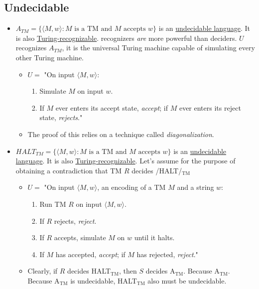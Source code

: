 \documentclass[12pt]{article}
\begin{document}
\subsection{Undecidable}
\label{sec:orgba64b64}
\begin{itemize}
\item \(A_{TM}=\{\langle{}M,w\rangle : M \text{ is a TM and } M \text{ accepts }
   w\}\) is an \uline{undecidable language}. It is also \uline{Turing-recognizable}. recognizers
\emph{are} more powerful than deciders. \(U\) recognizes \(A_{TM}\), it is the universal
Turing machine capable of simulating every other Turing machine. 
\begin{itemize}
\item \(U=\) "On input \(\langle{}M,w\rangle\):
\begin{enumerate}
\item Simulate \(M\) on input \(w\).
\item If \(M\) ever enters its accept state, \emph{accept}; if \(M\) ever enters its
reject state, \emph{rejects}."
\end{enumerate}
\item The proof of this relies on a technique called \emph{diagonalization}.
\end{itemize}

\item \(HALT_{TM}=\{\langle M,w \rangle : M \text{ is a TM and } M \text{ accepts } w\}\) is an
\uline{undecidable language}. It is also \uline{Turing-recognizable}. Let's assume for
the purpose of obtaining a contradiction that TM \(R\) decides /HALT/\(_{\text{TM}}\)
\begin{itemize}
\item \(U=\) "On input \(\langle M, w \rangle\), an encoding of a TM \(M\) and
a string \(w\):
\begin{enumerate}
\item Run TM \(R\) on input \(\langle M,w \rangle\).
\item If \(R\) rejects, \emph{reject}.
\item If \(R\) accepts, simulate \(M\) on \(w\) until it halts.
\item If \(M\) has accepted, \emph{accept}; if \(M\) has rejected, \emph{reject}."
\end{enumerate}
\item Clearly, if \(R\) decides HALT\(_{\text{TM}}\), then \(S\) decides A\(_{\text{TM}}\). Because A\(_{\text{TM}}\).
Because A\(_{\text{TM}}\) is undecidable, HALT\(_{\text{TM}}\) also must be undecidable.
\end{itemize}
\end{itemize}
\end{document}
